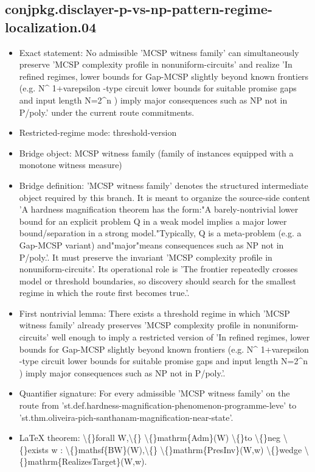 \documentclass[11pt]{article}
\begin{document}
\subsection*{conjpkg.disclayer-p-vs-np-pattern-regime-localization.04}
\begin{itemize}
\item Exact statement: No admissible 'MCSP witness family' can simultaneously preserve 'MCSP complexity profile in nonuniform-circuits' and realize 'In refined regimes, lower bounds for Gap-MCSP slightly beyond known frontiers (e.g. N\textasciicircum{} 1+varepsilon -type circuit lower bounds for suitable promise gaps and input length N=2\textasciicircum{}n ) imply major consequences such as NP not in P/poly.' under the current route commitments.
\item Restricted-regime mode: threshold-version
\item Bridge object: MCSP witness family (family of instances equipped with a monotone witness measure)
\item Bridge definition: 'MCSP witness family' denotes the structured intermediate object required by this branch. It is meant to organize the source-side content 'A hardness magnification theorem has the form:"A barely-nontrivial lower bound for an explicit problem Q in a weak model implies a major lower bound/separation in a strong model."Typically, Q is a meta-problem (e.g. a Gap-MCSP variant) and"major"means consequences such as NP not in P/poly.'. It must preserve the invariant 'MCSP complexity profile in nonuniform-circuits'. Its operational role is 'The frontier repeatedly crosses model or threshold boundaries, so discovery should search for the smallest regime in which the route first becomes true.'.
\item First nontrivial lemma: There exists a threshold regime in which 'MCSP witness family' already preserves 'MCSP complexity profile in nonuniform-circuits' well enough to imply a restricted version of 'In refined regimes, lower bounds for Gap-MCSP slightly beyond known frontiers (e.g. N\textasciicircum{} 1+varepsilon -type circuit lower bounds for suitable promise gaps and input length N=2\textasciicircum{}n ) imply major consequences such as NP not in P/poly.'.
\item Quantifier signature: For every admissible 'MCSP witness family' on the route from 'st.def.hardness-magnification-phenomenon-programme-leve' to 'st.thm.oliveira-pich-santhanam-magnification-near-state'.
\item LaTeX theorem: \textbackslash\{\}forall W,\textbackslash\{\} \textbackslash\{\}mathrm\{Adm\}(W) \textbackslash\{\}to \textbackslash\{\}neg \textbackslash\{\}exists w : \textbackslash\{\}mathsf\{BW\}(W),\textbackslash\{\} \textbackslash\{\}mathrm\{PresInv\}(W,w) \textbackslash\{\}wedge \textbackslash\{\}mathrm\{RealizesTarget\}(W,w).

\end{itemize}
\end{document}
